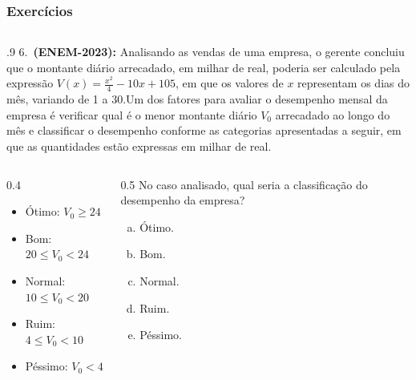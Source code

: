 \documentclass[aspectratio=169, t, 8pt]{beamer}
\begin{document}
    \begin{frame}
        \frametitle{Exercícios}
        \begin{columns}
            \begin{column}{.9\textwidth}
                6.~\textbf{(ENEM-2023): }Analisando as vendas de uma empresa, o gerente concluiu que o montante diário arrecadado, em milhar de real, poderia ser calculado pela expressão $V(x) = \frac{x^2}{4} - 10x + 105$, em que os valores de $x$ representam os dias do mês, variando de 1 a 30.Um dos fatores para avaliar o desempenho mensal da empresa é verificar qual é o menor montante diário $V_0$ arrecadado ao longo do mês e classificar o desempenho conforme as categorias apresentadas a seguir, em que as quantidades estão expressas em milhar de real.

                \begin{columns}
                    \begin{column}{0.4\textwidth}
                         \begin{itemize}
                        \item Ótimo: $V_0 \ge 24$
                        \item Bom: $20 \le V_0 < 24$
                        \item Normal: $10 \le V_0 < 20$
                        \item Ruim: $4 \le V_0 < 10$
                        \item Péssimo: $V_0 < 4$
                    \end{itemize}    
                    \end{column}
                    \begin{column}{0.5\textwidth}
                        No caso analisado, qual seria a classificação do desempenho da empresa?  
                        \begin{enumerate}[a.]
                            \item Ótimo.
                            \item Bom.
                            \item Normal.
                            \item Ruim.
                            \item Péssimo.
                        \end{enumerate}
                    \end{column}
                \end{columns}
            \end{column}
        \end{columns}
    \end{frame}
\end{document}
